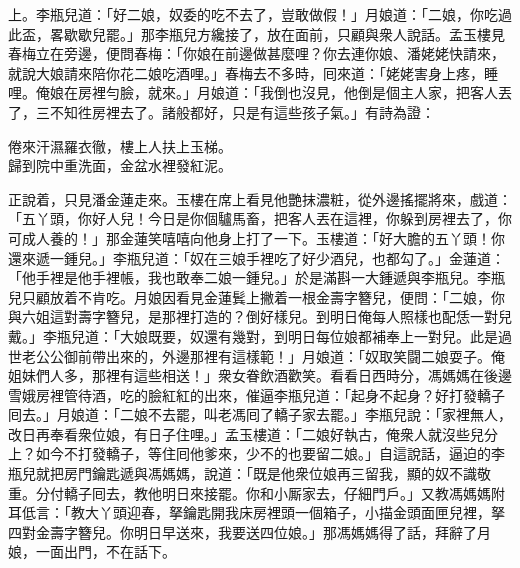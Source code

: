 上。李瓶兒道：「好二娘，奴委的吃不去了，豈敢做假！」月娘道：「二娘，你吃過此盃，畧歇歇兒罷。」那李瓶兒方纔接了，放在面前，只顧與衆人說話。孟玉樓見春梅立在旁邊，便問春梅：「你娘在前邊做甚麼哩？{}你去連你娘、潘姥姥快請來，就說大娘請來陪你花二娘吃酒哩。」春梅去不多時，囘來道：「姥姥害身上疼，睡哩。俺娘在房裡勻臉，就來。」月娘道：「我倒也沒見，他倒是個主人家，把客人丟了，三不知徃房裡去了。諸般都好，只是有這些孩子氣。」{}有詩為證：

\begin{myquote}
倦來汗濕羅衣徹，樓上人扶上玉梯。\\歸到院中重洗面，金盆水裡發紅泥。
\end{myquote}

正說着，只見潘金蓮走來。玉樓在席上看見他艷抹濃粧，從外邊搖擺將來，戲道：「五丫頭，你好人兒！今日是你個驢馬畜，把客人丟在這裡，你躲到房裡去了，你可成人養的！」那金蓮笑嘻嘻向他身上打了一下。{}玉樓道：「好大膽的五丫頭！你還來遞一鍾兒。」李瓶兒道：「奴在三娘手裡吃了好少酒兒，也都勾了。」金蓮道：「他手裡是他手裡帳，我也敢奉二娘一鍾兒。」於是滿斟一大鍾遞與李瓶兒。李瓶兒只顧放着不肯吃。月娘因看見金蓮鬂上撇着一根金壽字簪兒，便問：「二娘，你與六姐這對壽字簪兒，是那裡打造的？倒好樣兒。到明日俺每人照樣也配恁一對兒戴。」李瓶兒道：「大娘既要，奴還有幾對，到明日每位娘都補奉上一對兒。此是過世老公公御前帶出來的，外邊那裡有這樣範！」月娘道：「奴取笑闘二娘耍子。俺姐妹們人多，那裡有這些相送！」衆女眷飲酒歡笑。看看日西時分，馮媽媽在後邊雪娥房裡管待酒，吃的臉紅紅的出來，催逼李瓶兒道：「起身不起身？好打發轎子囘去。」月娘道：「二娘不去罷，叫老馮囘了轎子家去罷。」李瓶兒說：「家裡無人，改日再奉看衆位娘，有日子住哩。」孟玉樓道：「二娘好執古，俺衆人就沒些兒分上？如今不打發轎子，等住囘他爹來，少不的也要留二娘。」{}自這說話，逼迫的李瓶兒就把房門鑰匙遞與馮媽媽，說道：「既是他衆位娘再三留我，顯的奴不識敬重。分付轎子囘去，教他明日來接罷。你和小厮家去，仔細門戶。」又教馮媽媽附耳低言：「教大丫頭迎春，拏鑰匙開我床房裡頭一個箱子，小描金頭面匣兒裡，拏四對金壽字簪兒。你明日早送來，我要送四位娘。」那馮媽媽得了話，拜辭了月娘，一面出門，不在話下。

